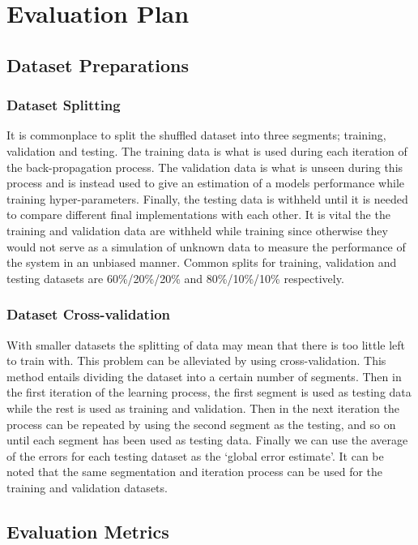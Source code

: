 \chapter{Evaluation Plan} \label{chap:evaluation_plan}

\section{Dataset Preparations}

\subsection{Dataset Splitting}

It is commonplace to split the shuffled dataset into  three segments; training, validation and testing. The training data is what is used during each iteration of the back-propagation process. The validation data is what is unseen during this process and is instead used to give an estimation of a models performance while training hyper-parameters. Finally, the testing data is withheld until it is needed to compare different final implementations with each other. It is vital the the training and validation data are withheld while training since otherwise they would not serve as a simulation of unknown data to measure the performance of the system in an unbiased manner. Common splits for training, validation and testing datasets are 60\%/20\%/20\% and 80\%/10\%/10\%  respectively.

\subsection{Dataset Cross-validation}

With smaller datasets the splitting of data may mean that there is too little left to train with. This problem can be alleviated by using cross-validation. This method entails dividing the dataset into a certain number of segments. Then in the first iteration of the learning process, the first segment is used as testing data while the rest is used as training and validation. Then in the next iteration the process can be repeated by using the second segment as the testing, and so on until each segment has been used as testing data. Finally we can use the average of the errors for each testing dataset as the `global error estimate'. It can be noted that the same segmentation and iteration process can be used for the training and validation datasets.

\section{Evaluation Metrics}


